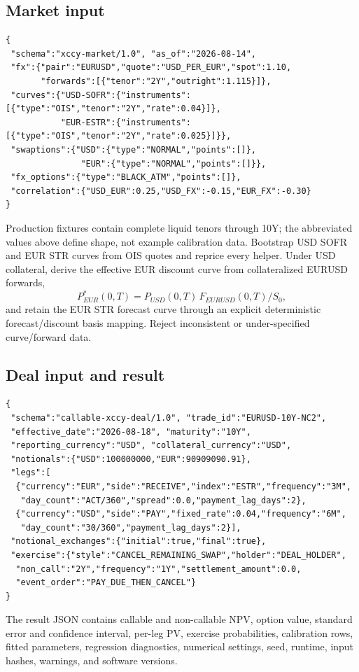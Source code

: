 \documentclass[conference]{IEEEtran}
\begin{document}
\subsection{Market input}

\begin{lstlisting}
{
 "schema":"xccy-market/1.0", "as_of":"2026-08-14",
 "fx":{"pair":"EURUSD","quote":"USD_PER_EUR","spot":1.10,
       "forwards":[{"tenor":"2Y","outright":1.115}]},
 "curves":{"USD-SOFR":{"instruments":[{"type":"OIS","tenor":"2Y","rate":0.04}]},
           "EUR-ESTR":{"instruments":[{"type":"OIS","tenor":"2Y","rate":0.025}]}},
 "swaptions":{"USD":{"type":"NORMAL","points":[]},
               "EUR":{"type":"NORMAL","points":[]}},
 "fx_options":{"type":"BLACK_ATM","points":[]},
 "correlation":{"USD_EUR":0.25,"USD_FX":-0.15,"EUR_FX":-0.30}
}
\end{lstlisting}
Production fixtures contain complete liquid tenors through 10Y; the abbreviated values above define shape, not example calibration data. Bootstrap USD SOFR and EUR \texteuro STR curves from OIS quotes and reprice every helper. Under USD collateral, derive the effective EUR discount curve from collateralized EURUSD forwards,
\[
 P_{EUR}^{*}(0,T)=P_{USD}(0,T)\,F_{EURUSD}(0,T)/S_0,
\]
and retain the EUR \texteuro STR forecast curve through an explicit deterministic forecast/discount basis mapping. Reject inconsistent or under-specified curve/forward data.

\subsection{Deal input and result}

\begin{lstlisting}
{
 "schema":"callable-xccy-deal/1.0", "trade_id":"EURUSD-10Y-NC2",
 "effective_date":"2026-08-18", "maturity":"10Y",
 "reporting_currency":"USD", "collateral_currency":"USD",
 "notionals":{"USD":100000000,"EUR":90909090.91},
 "legs":[
  {"currency":"EUR","side":"RECEIVE","index":"ESTR","frequency":"3M",
   "day_count":"ACT/360","spread":0.0,"payment_lag_days":2},
  {"currency":"USD","side":"PAY","fixed_rate":0.04,"frequency":"6M",
   "day_count":"30/360","payment_lag_days":2}],
 "notional_exchanges":{"initial":true,"final":true},
 "exercise":{"style":"CANCEL_REMAINING_SWAP","holder":"DEAL_HOLDER",
  "non_call":"2Y","frequency":"1Y","settlement_amount":0.0,
  "event_order":"PAY_DUE_THEN_CANCEL"}
}
\end{lstlisting}
The result JSON contains callable and non-callable NPV, option value, standard error and confidence interval, per-leg PV, exercise probabilities, calibration rows, fitted parameters, regression diagnostics, numerical settings, seed, runtime, input hashes, warnings, and software versions.
\end{document}
